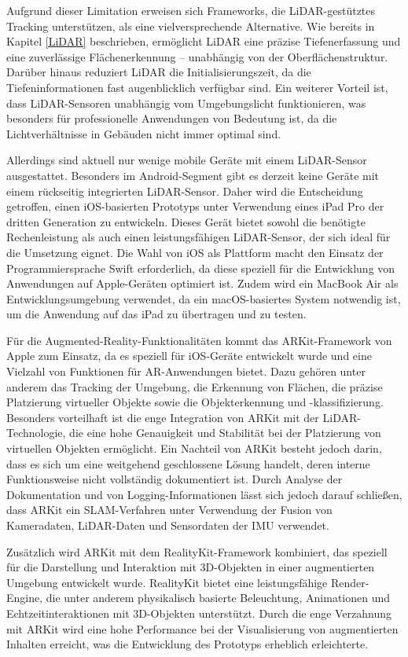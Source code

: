 Aufgrund dieser Limitation erweisen sich Frameworks, die LiDAR-gestütztes Tracking unterstützen, als eine vielversprechende Alternative. Wie bereits in Kapitel \ref{LiDAR} beschrieben, ermöglicht LiDAR eine präzise Tiefenerfassung und eine zuverlässige Flächenerkennung – unabhängig von der Oberflächenstruktur. Darüber hinaus reduziert LiDAR die Initialisierungszeit, da die Tiefeninformationen fast augenblicklich verfügbar sind. Ein weiterer Vorteil ist, dass LiDAR-Sensoren unabhängig vom Umgebungslicht funktionieren, was besonders für professionelle Anwendungen von Bedeutung ist, da die Lichtverhältnisse in Gebäuden nicht immer optimal sind.

Allerdings sind aktuell nur wenige mobile Geräte mit einem LiDAR-Sensor ausgestattet. Besonders im Android-Segment gibt es derzeit keine Geräte mit einem rückseitig integrierten LiDAR-Sensor. Daher wird die Entscheidung getroffen, einen iOS-basierten Prototyps unter Verwendung eines iPad Pro der dritten Generation zu entwickeln. Dieses Gerät bietet sowohl die benötigte Rechenleistung als auch einen leistungsfähigen LiDAR-Sensor, der sich ideal für die Umsetzung eignet. Die Wahl von iOS als Plattform macht den Einsatz der Programmiersprache Swift erforderlich, da diese speziell für die Entwicklung von Anwendungen auf Apple-Geräten optimiert ist. Zudem wird ein MacBook Air als Entwicklungsumgebung verwendet, da ein macOS-basiertes System notwendig ist, um die Anwendung auf das iPad zu übertragen und zu testen.

Für die Augmented-Reality-Funktionalitäten kommt das ARKit-Framework von Apple zum Einsatz, da es speziell für iOS-Geräte entwickelt wurde und eine Vielzahl von Funktionen für AR-Anwendungen bietet. Dazu gehören unter anderem das Tracking der Umgebung, die Erkennung von Flächen, die präzise Platzierung virtueller Objekte sowie die Objekterkennung und -klassifizierung. Besonders vorteilhaft ist die enge Integration von ARKit mit der LiDAR-Technologie, die eine hohe Genauigkeit und Stabilität bei der Platzierung von virtuellen Objekten ermöglicht. Ein Nachteil von ARKit besteht jedoch darin, dass es sich um eine weitgehend geschlossene Lösung handelt, deren interne Funktionsweise nicht vollständig dokumentiert ist. Durch Analyse der Dokumentation und von Logging-Informationen lässt sich jedoch darauf schließen, dass ARKit ein SLAM-Verfahren unter Verwendung der Fusion von Kameradaten, LiDAR-Daten und Sensordaten der IMU verwendet.

Zusätzlich wird ARKit mit dem RealityKit-Framework kombiniert, das speziell für die Darstellung und Interaktion mit 3D-Objekten in einer augmentierten Umgebung entwickelt wurde. RealityKit bietet eine leistungsfähige Render-Engine, die unter anderem physikalisch basierte Beleuchtung, Animationen und Echtzeitinteraktionen mit 3D-Objekten unterstützt. Durch die enge Verzahnung mit ARKit wird eine hohe Performance bei der Visualisierung von augmentierten Inhalten erreicht, was die Entwicklung des Prototyps erheblich erleichterte.

